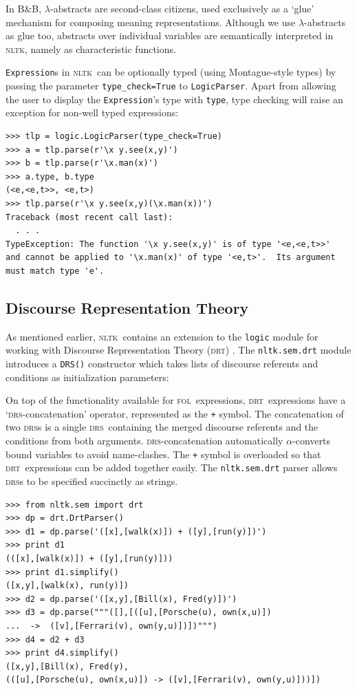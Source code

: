 \documentclass[11pt, a4paper]{article}
\newcommand{\BB}{\textsc{B{\small\&}B}}
\newcommand{\DRS}{\textsc{drs}}
\newcommand{\DRT}{\textsc{drt}}
\newcommand{\FOL}{\textsc{fol}}
\newcommand{\NLTK}{\textsc{nltk}}
\begin{document}
In \BB, $\lambda$-abstracts are second-class citizens, used
exclusively as a `glue' mechanism for composing meaning
representations. Although we use $\lambda$-abstracts as glue too,
abstracts over individual variables are semantically interpreted in \NLTK, namely as
characteristic functions.

\texttt{Expression}s in \NLTK\ can be optionally typed (using
Montague-style types) by passing the parameter \texttt{type\_check=True} to
\texttt{LogicParser}.  Apart from allowing the user to display the
\texttt{Expression}'s type with \texttt{type}, type checking will
raise an exception for non-well typed expressions:
\begin{Verbatim}
>>> tlp = logic.LogicParser(type_check=True)
>>> a = tlp.parse(r'\x y.see(x,y)')
>>> b = tlp.parse(r'\x.man(x)')
>>> a.type, b.type
(<e,<e,t>>, <e,t>)
>>> tlp.parse(r'\x y.see(x,y)(\x.man(x))')
Traceback (most recent call last):
  . . .
TypeException: The function '\x y.see(x,y)' is of type '<e,<e,t>>' 
and cannot be applied to '\x.man(x)' of type '<e,t>'.  Its argument 
must match type 'e'.
\end{Verbatim}

\subsection{Discourse Representation Theory}
As mentioned earlier, \NLTK\ contains an extension to the
\texttt{logic} module for working with Discourse Representation Theory
(\DRT) \citep{KampReyle}.  The \texttt{nltk.sem.drt} module introduces
a \texttt{DRS()} constructor which takes lists of discourse referents
and conditions as initialization parameters:
\vspace{-2ex}

On top of the functionality available for \FOL\
expressions, \DRT\ expressions have a `\DRS-concatenation' operator,
represented as the \texttt{+} symbol.  The concatenation of two \DRS s
is a single \DRS\ containing the merged discourse referents and the
conditions from both arguments.  \DRS-concatenation automatically
$\alpha$-converts bound variables to avoid name-clashes.  The
\texttt{+} symbol is overloaded so that \DRT\ expressions can be added
together easily.  The \texttt{nltk.sem.drt} parser allows \DRS s to be
specified succinctly as strings.
\begin{Verbatim}
>>> from nltk.sem import drt
>>> dp = drt.DrtParser()
>>> d1 = dp.parse('([x],[walk(x)]) + ([y],[run(y)])')
>>> print d1
(([x],[walk(x)]) + ([y],[run(y)]))
>>> print d1.simplify()
([x,y],[walk(x), run(y)])
>>> d2 = dp.parse('([x,y],[Bill(x), Fred(y)])')
>>> d3 = dp.parse("""([],[([u],[Porsche(u), own(x,u)])
...  ->  ([v],[Ferrari(v), own(y,u)])])""")
>>> d4 = d2 + d3
>>> print d4.simplify()
([x,y],[Bill(x), Fred(y),
(([u],[Porsche(u), own(x,u)]) -> ([v],[Ferrari(v), own(y,u)]))])
\end{Verbatim}
\end{document}
